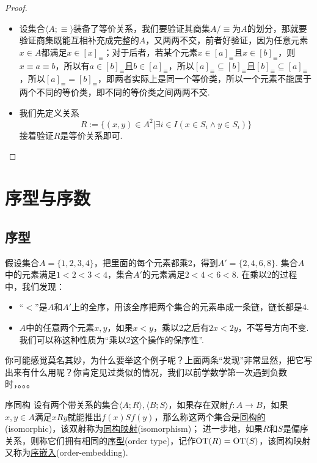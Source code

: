 \begin{proof}
    \begin{itemize}
        \item 设集合\(\langle A; \equiv \rangle\)装备了等价关系，我们要验证其商集\(A/\equiv\)为\(A\)的划分，那就要验证商集既能互相补充成完整的\(A\)，又两两不交，前者好验证，因为任意元素\(x \in A\)都满足\(x \in [x]_\equiv\)；对于后者，若某个元素\(x \in [a]_\equiv\)且\(x \in [b]_\equiv\)，则\(x \equiv a \equiv b\)，所以有\(a \in [b]_\equiv\)且\(b \in [a]_\equiv\)，所以\([a]_\equiv \subseteq [b]_\equiv\)且\([b]_\equiv \subseteq [a]_\equiv\)，所以\([a]_\equiv = [b]_\equiv\)，即两者实际上是同一个等价类，所以一个元素不能属于两个不同的等价类，即不同的等价类之间两两不交.
        \item 我们先定义关系
        \[R := \{(x,y) \in A^2 | \exists i \in I(x \in S_i \wedge y \in S_i)\}\]
        接着验证\(R\)是等价关系即可. 
    \end{itemize}
\end{proof}

\section{序型与序数}

\subsection{序型}

假设集合\(A = \{1,2,3,4\}\)，把里面的每个元素都乘2，得到\(A' = \{2,4,6,8\}\). 集合\(A\)中的元素满足\(1<2<3<4\)，集合\(A'\)的元素满足\(2<4<6<8\). 在乘以\(2\)的过程中，我们发现：
\begin{itemize}
    \item “\(<\)”是\(A\)和\(A'\)上的全序，用该全序把两个集合的元素串成一条链，链长都是4.
    \item \(A\)中的任意两个元素\(x,y\)，如果\(x<y\)，乘以2之后有\(2x<2y\)，不等号方向不变. 我们可以称这种性质为“乘以2这个操作的保序性”.
\end{itemize}
你可能感觉莫名其妙，为什么要举这个例子呢？上面两条“发现”非常显然，把它写出来有什么用呢？你肯定见过类似的情况，我们以前学数学第一次遇到负数时，。。。

\begin{definition}{序同构}
    设有两个带关系的集合\(\langle A; R \rangle, \langle B; S \rangle\)，如果存在双射\(f:A \to B\)，如果\(x,y \in A\)满足\(x R y\)就能推出\(f(x) S f(y)\)，那么称这两个集合是\underline{同构的}(isomorphic)，该双射称为\underline{同构映射}(isomorphism)；\newline
    进一步地，如果\(R\)和\(S\)是偏序关系，则称它们拥有相同的\underline{序型}(order type)，记作\({\rm OT}(R) = {\rm OT}(S)\)，该同构映射又称为\underline{序嵌入}(order-embedding).
\end{definition}

